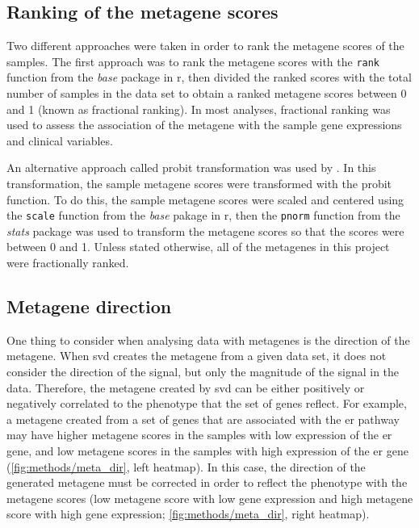 \subsection{Ranking of the metagene scores}
\label{sub:ranking_of_the_metagene_scores}

Two different approaches were taken in order to rank the metagene scores of the samples.
The first approach was to rank the metagene scores with the \texttt{rank} function from the \textit{base} package in \gls{r}, then divided the ranked scores with the total number of samples in the data set to obtain a ranked metagene scores between 0 and 1 (known as fractional ranking).
In most analyses, fractional ranking was used to assess the association of the metagene with the sample gene expressions and clinical variables.

An alternative approach called probit transformation was used by \citet{Gatza2010a}.
In this transformation, the sample metagene scores were transformed with the probit function.
To do this, the sample metagene scores were scaled and centered using the \texttt{scale} function from the \textit{base} pakage in \gls{r}, then the \texttt{pnorm} function from the \textit{stats} package was used to transform the metagene scores so that the scores were between 0 and 1.
Unless stated otherwise, all of the metagenes in this project were fractionally ranked.

\subsection{Metagene direction}
\label{sub:metagene_direction}

One thing to consider when analysing data with metagenes is the direction of the metagene.
When \gls{svd} creates the metagene from a given data set, it does not consider the direction of the signal, but only the magnitude of the signal in the data.
Therefore, the metagene created by \gls{svd} can be either positively or negatively correlated to the phenotype that the set of genes reflect.
For example, a metagene created from a set of genes that are associated with the \gls{er} pathway may have higher metagene scores in the samples with low expression of the \gls{er} gene, and low metagene scores in the samples with high expression of the \gls{er} gene (\cref{fig:methods/meta_dir}, left heatmap).
In this case, the direction of the generated metagene must be corrected in order to reflect the phenotype with the metagene scores (low metagene score with low gene expression and high metagene score with high gene expression; \cref{fig:methods/meta_dir}, right heatmap).

